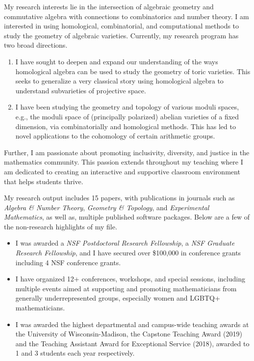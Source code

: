 \documentclass[11pt]{article}
\begin{document}
My research interests lie in the intersection of algebraic geometry and commutative algebra with connections to combinatorics and number theory. I am interested in using homological, combinatorial, and computational methods to study the geometry of algebraic varieties. Currently, my research program has two broad directions.
\begin{enumerate}[leftmargin=*,label=(\roman*)]
\item I have sought to deepen and expand our understanding of the ways homological algebra can be used to study the geometry of toric varieties. This seeks to generalize a very classical story using homological algebra to understand subvarieties of projective space.
\item I have been studying the geometry and topology of various moduli spaces, e.g., the moduli space of (principally polarized) abelian varieties of a fixed dimension, via combinatorially and homological methods. This has led to novel applications to the cohomology of certain arithmetic groups. 
\end{enumerate}
Further, I am passionate about promoting inclusivity, diversity, and justice in the mathematics community. This passion extends throughout my teaching where I am dedicated to creating an interactive and supportive classroom environment that helps students thrive.


My research output includes 15 papers, with publications in journals such as \textit{Algebra \& Number Theory}, \textit{Geometry \& Topology}, and \textit{Experimental Mathematics}, as well as, multiple published software packages. Below are a few of the non-research highlights of my file.

\begin{itemize}[leftmargin=*]
\item I was awarded a \textit{NSF Postdoctoral Research Fellowship}, a \textit{NSF Graduate Research Fellowship}, and I have secured over \$100,000 in conference grants including 4 NSF conference grants. 
\item I have organized 12+ conferences, workshops, and special sessions, including multiple events aimed at supporting and promoting mathematicians from generally underrepresented groups, especially women and LGBTQ+ mathematicians. 
\item I was awarded the highest departmental and campus-wide teaching awards at the University of Wisconsin-Madison, the Capstone Teaching Award (2019) and the Teaching Assistant Award for Exceptional Service (2018), awarded to 1 and 3 students each year respectively. 
\end{itemize}
\end{document}
